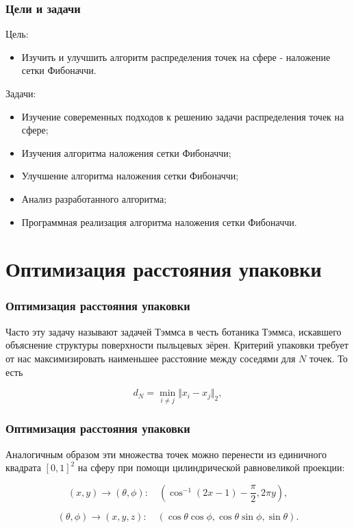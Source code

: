 \documentclass[12pt, aspectratio=169]{beamer}
\begin{document}
\begin{frame}
\frametitle{Цели и задачи}

Цель:
\begin{itemize}
    \item Изучить и улучшить алгоритм распределения точек на сфере - наложение сетки Фибоначчи.
\end{itemize}

Задачи:
\begin{itemize}
    \item Изучение совеременных подходов к решению задачи распределения точек на сфере;
    \item Изучения алгоритма наложения сетки Фибоначчи;
    \item Улучшение алгоритма наложения сетки Фибоначчи;
    \item Анализ разработанного алгоритма;
    \item Программная реализация алгоритма наложения сетки Фибоначчи.
\end{itemize}

\end{frame}


\section{Оптимизация расстояния упаковки}

\begin{frame}
\frametitle{Оптимизация расстояния упаковки}

 Часто эту задачу называют задачей Тэммса в честь ботаника Тэммса, искавшего объяснение структуры поверхности пыльцевых зёрен. Критерий упаковки требует от нас максимизировать наименьшее расстояние между соседями для $N$ точек. То есть

\begin{displaymath}
    d_N = \min_{i \neq j} \Vert x_i - x_j \Vert _2,
\end{displaymath}
  
\end{frame}


\begin{frame}
\frametitle{Оптимизация расстояния упаковки}

Аналогичным образом эти множества точек можно перенести из единичного квадрата $[0, 1]^2$ на сферу при помощи цилиндрической равновеликой проекции:

\begin{displaymath}
    (x,y) \rightarrow (\theta, \phi) : \quad \left( \cos^{-1}(2x-1) - \frac{\pi}{2}, 2\pi y \right),
\end{displaymath}

\begin{displaymath}
    (\theta,\phi) \rightarrow (x,y,z) : \quad \left (\cos\theta \cos\phi, \cos \theta \sin \phi, \sin \theta \right).
\end{displaymath}
  
\end{frame}
\end{document}
